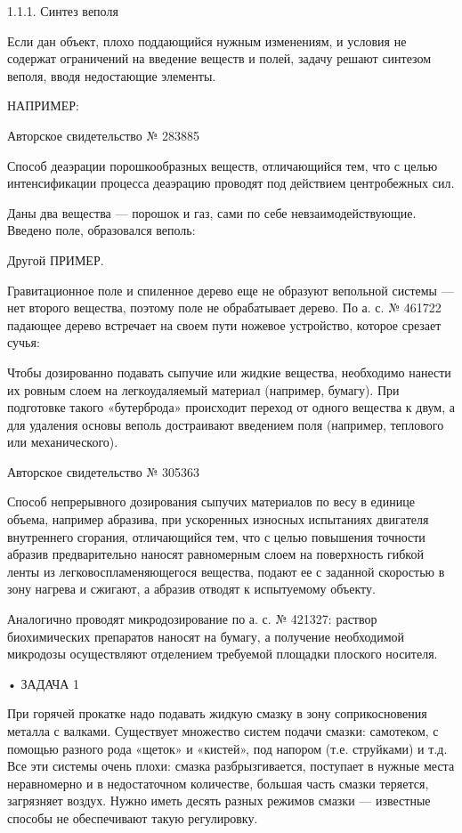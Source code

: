 1.1.1. Синтез веполя

Если дан  объект, плохо  поддающийся нужным  изменениям, и  условия не
содержат  ограничений  на  введение  веществ и  полей,  задачу  решают
синтезом веполя, вводя недостающие элементы.



НАПРИМЕР:


Авторское свидетельство № 283885

Способ  деаэрации  порошкообразных   веществ,  отличающийся  тем,  что
с  целью  интенсификации  процесса деаэрацию  проводят  под  действием
центробежных сил.

Даны два вещества  — порошок и газ, сами  по себе невзаимодействующие.
Введено поле, образовался веполь:


Другой ПРИМЕР.

Гравитационное  поле  и спиленное  дерево  еще  не образуют  вепольной
системы — нет  второго вещества, поэтому поле  не обрабатывает дерево.
По а.  с. №  461722 падающее  дерево встречает  на своем  пути ножевое
устройство, которое срезает сучья:

Чтобы  дозированно подавать  сыпучие или  жидкие вещества,  необходимо
нанести их ровным слоем на легкоудаляемый материал (например, бумагу).
При  подготовке  такого  «бутерброда»  происходит  переход  от  одного
вещества к  двум, а для  удаления основы веполь  достраивают введением
поля (например, теплового или механического).


Авторское свидетельство № 305363

Способ непрерывного  дозирования сыпучих материалов по  весу в единице
объема,   например  абразива,   при  ускоренных   износных  испытаниях
двигателя  внутреннего   сгорания,  отличающийся  тем,  что   с  целью
повышения точности абразив предварительно наносят равномерным слоем на
поверхность гибкой ленты из легковоспламеняющегося вещества, подают ее
с заданной  скоростью в зону  нагрева и  сжигают, а абразив  отводят к
испытуемому объекту.

Аналогично  проводят  микродозирование  по  а. с.  №  421327:  раствор
биохимических препаратов  наносят на  бумагу, а  получение необходимой
микродозы   осуществляют   отделением  требуемой   площадки   плоского
носителя.


• ЗАДАЧА 1

При   горячей   прокатке   надо   подавать  жидкую   смазку   в   зону
соприкосновения металла с валками.  Существует множество систем подачи
смазки:  самотеком, с  помощью разного  рода «щеток»  и «кистей»,  под
напором  (т.е.  струйками)  и  т.д.   Все  эти  системы  очень  плохи:
смазка  разбрызгивается, поступает  в  нужные места  неравномерно и  в
недостаточном  количестве, большая  часть смазки  теряется, загрязняет
воздух. Нужно иметь  десять разных режимов смазки  — известные способы
не обеспечивают такую регулировку.

